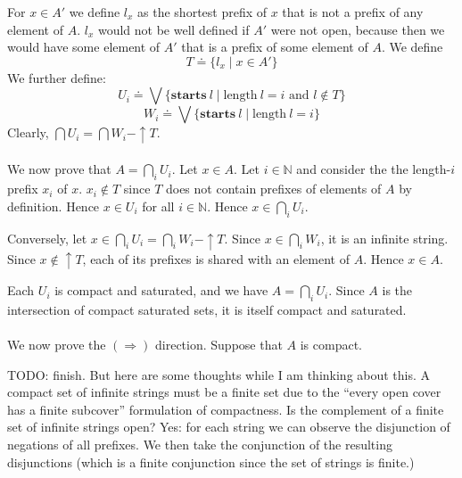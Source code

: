 \documentclass{article}
\newcommand{\mbf}{\mathbf}
\begin{document}
For $x \in A'$ we define $l_x$ as the shortest prefix of $x$ that is not a prefix of any element of $A$. $l_x$ would not be well defined if $A'$ were not open, because then we would have some element of $A'$ that is a prefix of some element of $A$. We define
$$T \doteq \{ l_x \mid x \in A' \}$$
We further define:
$$U_i \doteq \bigvee \{ \mbf{starts}~l \mid \text{length}~l = i \text{ and } l \not \in T \} $$
$$W_i \doteq  \bigvee \{ \mbf{starts}~l \mid \text{length}~l = i \}$$
Clearly, $\bigcap U_i = \bigcap W_i - \uparrow T$.\\~\\
We now prove that $A = \bigcap_{i} U_i$. Let $x \in A$. Let $i \in \mathbb N$ and consider the the length-$i$ prefix $x_i$ of $x$. $x_i \not \in T$ since $T$ does not contain prefixes of elements of $A$ by definition. Hence $x \in U_i$ for all $i \in \mathbb N$. Hence $x \in \bigcap_{i} U_i$.

Conversely, let $x \in \bigcap_i U_i = \bigcap_i W_i - \uparrow T$. Since $x \in \bigcap_i W_i$, it is an infinite string. Since $x \not \in \uparrow T$, each of its prefixes is shared with an element of $A$. Hence $x \in A$.

Each $U_i$ is compact and saturated, and we have $A = \bigcap_{i} U_i$. Since $A$ is the intersection of compact saturated sets,
it is itself compact and saturated. \\~\\
We now prove the $(\Rightarrow)$ direction. Suppose that $A$ is compact.

TODO: finish. But here are some thoughts while I am thinking about this. A compact set of infinite strings must be a finite set due to the ``every open cover has a finite subcover'' formulation of compactness. Is the complement of a finite set of infinite strings open? Yes: for each string we can observe the disjunction of negations of all prefixes. We then take the conjunction of the resulting disjunctions (which is a finite conjunction since the set of strings is finite.)
\end{document}
